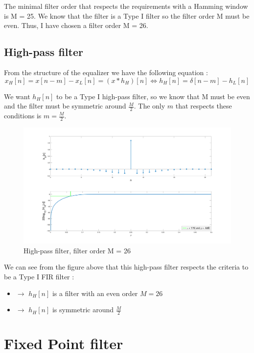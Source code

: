 \documentclass[a4paper]{article}
\begin{document}
The minimal filter order that respects the requirements with a Hamming window is M = 25. We know that the filter is a Type I filter so the filter order M must be even. Thus, I have chosen a filter order M = 26.

\subsection{High-pass filter}

From the structure of the equalizer we have the following equation : 
\begin{equation}
	x_H[n] = x[n-m] - x_L[n] = (x*h_H)[n] \Leftrightarrow h_H[n] = \delta[n-m] - h_L[n]
\end{equation}

We want $h_H[n]$ to be a Type I high-pass filter, so we know that M must be even and the filter must be symmetric around $\frac{M}{2}$. The only $m$ that respects these conditions is $m = \frac{M}{2}$.

\begin{figure}[!ht]
\includegraphics[scale = 0.12]{highpass}
\caption{High-pass filter, filter order M = 26}
\label{fig:high}
\end{figure}

We can see from the figure above that this high-pass filter respects the criteria to be a Type I FIR filter : 

\begin{itemize}
	\item[] $\rightarrow$ $h_H[n]$ is a filter with an even order $M = 26$
	\item[] $\rightarrow$ $h_H[n]$ is symmetric around $\frac{M}{2}$
\end{itemize}


\section{Fixed Point filter}
\label{sec:fixed Point filter}
\end{document}
